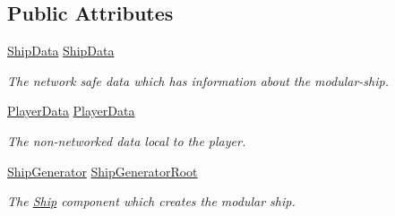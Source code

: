\subsection*{Public Attributes}
\begin{DoxyCompactItemize}
\item 
\hyperlink{class_skyrates_1_1_ship_1_1_ship_data}{Ship\-Data} \hyperlink{class_skyrates_1_1_entity_1_1_entity_player_ship_af6c72c799869168d507cec7914ed0ccc}{Ship\-Data}
\begin{DoxyCompactList}\small\item\em The network safe data which has information about the modular-\/ship. \end{DoxyCompactList}\item 
\hyperlink{class_skyrates_1_1_data_1_1_player_data}{Player\-Data} \hyperlink{class_skyrates_1_1_entity_1_1_entity_player_ship_a9dff4c7af9e4872a6bd58b821d12d3df}{Player\-Data}
\begin{DoxyCompactList}\small\item\em The non-\/networked data local to the player. \end{DoxyCompactList}\item 
\hyperlink{class_skyrates_1_1_ship_1_1_ship_generator}{Ship\-Generator} \hyperlink{class_skyrates_1_1_entity_1_1_entity_player_ship_abec0fc0c6cc3462c7019ac48b74879ca}{Ship\-Generator\-Root}
\begin{DoxyCompactList}\small\item\em The \hyperlink{namespace_skyrates_1_1_ship}{Ship} component which creates the modular ship. \end{DoxyCompactList}\end{DoxyCompactItemize}
